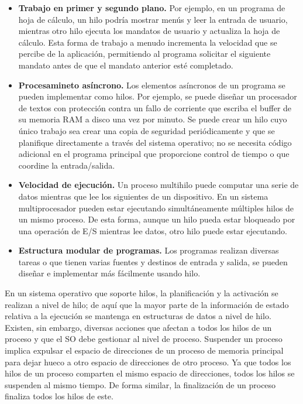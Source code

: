 \documentclass{article}
\begin{document}
					\begin{itemize}
					\item \textbf{Trabajo en primer y segundo plano.} Por ejemplo, en un programa de hoja de cálculo, un hilo podría mostrar menús y leer la entrada de usuario, mientras otro hilo ejecuta los mandatos de usuario y actualiza la hoja de cálculo. Esta forma de trabajo a menudo incrementa la velocidad que se percibe de la aplicación, permitiendo al programa solicitar el siguiente mandato antes de que el mandato anterior esté completado.
					
					\item \textbf{Procesamineto asíncrono.} Los elementos asíncronos de un programa se pueden implementar como hilos. Por ejemplo, se puede diseñar un procesador de textos con protección contra un fallo de corriente que escriba el buffer de su memoria RAM a disco una vez por minuto. Se puede crear un hilo cuyo único trabajo sea crear una copia de seguridad periódicamente y que se planifique directamente a través del sistema operativo; no se necesita código adicional en el programa principal que proporcione control de tiempo o que coordine la entrada/salida.
					
					\item \textbf{Velocidad de ejecución.} Un proceso multihilo puede computar una serie de datos mientras que lee los siguientes de un dispositivo. En un sistema multiprocesador pueden estar ejecutando simultáneamente múltiples hilos de un mismo proceso. De esta forma, aunque un hilo pueda estar bloqueado por una operación de E/S mientras lee datos, otro hilo puede estar ejecutando.
					
					\item \textbf{Estructura modular de programas.} Los programas realizan diversas tareas o que tienen varias fuentes y destinos de entrada y salida, se pueden diseñar e implementar más fácilmente usando hilo.
					\end{itemize}
					
					En un sistema operativo que soporte hilos, la planificación y la activación se realizan a nivel de hilo; de aquí que la mayor parte de la información de estado relativa a la ejecución se mantenga en estructuras de datos a nivel de hilo. Existen, sin embargo, diversas acciones que afectan a todos los hilos de un proceso y que el SO debe gestionar al nivel de proceso. Suspender un proceso implica expulsar el espacio de direcciones de un proceso de memoria principal para dejar hueco a otro espacio de direcciones de otro proceso. Ya que todos los hilos de un proceso comparten el mismo espacio de direcciones, todos los hilos se suspenden al mismo tiempo. De forma similar, la finalización de un proceso finaliza todos los hilos de este.
\end{document}
